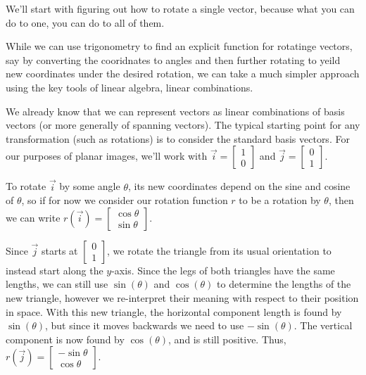 \documentclass{ximera}
\begin{document}
        We'll start with figuring out how to rotate a single vector, because what you can do to one, you can do to all of them.

    \begin{example}

        While we can use trigonometry to find an explicit function for rotatinge vectors, say by converting the cooridnates to angles and then further rotating to yeild new coordinates under the desired rotation, we can take a much simpler approach using the key tools of linear algebra, linear combinations.

        We already know that we can represent vectors as linear combinations of basis vectors (or more generally of spanning vectors). The typical starting point for any transformation (such as rotations) is to consider the standard basis vectors. For our purposes of planar images, we'll work with $\vec{i} = \begin{bmatrix} 1 \\ 0 \end{bmatrix}$ and $\vec{j} = \begin{bmatrix} 0 \\ 1 \end{bmatrix}$.

        To rotate $\vec{i}$ by some angle $\theta$, its new coordinates depend on the sine and cosine of $\theta$, so if for now we consider our rotation function $r$ to be a rotation by $\theta$, then we can write $r(\vec{i}) = \begin{bmatrix} \cos\theta \\ \sin\theta \end{bmatrix}$.

        Since $\vec{j}$ starts at $\begin{bmatrix} 0 \\ 1 \end{bmatrix}$, we rotate the triangle from its usual orientation to instead start along the $y$-axis. Since the legs of both triangles have the same lengths, we can still use $\sin(\theta)$ and $\cos(\theta)$ to determine the lengths of the new triangle, however we re-interpret their meaning with respect to their position in space. With this new triangle, the horizontal component length is found by $\sin(\theta)$, but since it moves backwards we need to use $-\sin(\theta)$. The vertical component is now found by $\cos(\theta)$, and is still positive. Thus, $r(\vec{j}) = \begin{bmatrix} -\sin\theta \\ \cos\theta \end{bmatrix}$.


\end{example}
\end{document}
